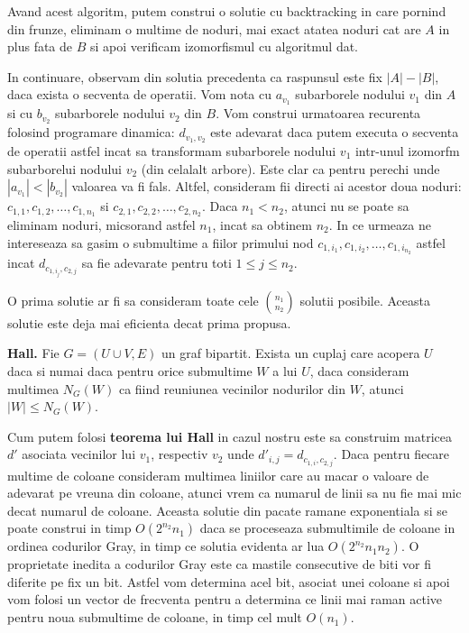 Avand acest algoritm, putem construi o solutie cu backtracking in care pornind din frunze, eliminam o multime de noduri, mai exact atatea
noduri cat are $A$ in plus fata de $B$ si apoi verificam izomorfismul cu algoritmul dat.

In continuare, observam din solutia precedenta ca raspunsul este fix $|A| - |B|$, daca exista o secventa de operatii. Vom nota cu $a_{v_{1}}$
subarborele nodului $v_{1}$ din $A$ si cu $b_{v_{2}}$ subarborele nodului $v_{2}$ din $B$. Vom construi urmatoarea recurenta folosind
programare dinamica: $d_{v_{1}, v_{2}}$ este adevarat daca putem executa o secventa de operatii astfel incat sa transformam subarborele
nodului $v_{1}$ intr-unul izomorfm subarborelui nodului $v_{2}$ (din celalalt arbore). Este clar ca pentru perechi unde $|a_{v_{1}}| < |b_{v_{2}}|$ valoarea va fi fals. Altfel, consideram fii directi ai acestor doua noduri: $c_{1, 1}, c_{1, 2}, \ldots, c_{1, n_{1}}$ si $c_{2, 1}, c_{2, 2}, \ldots, c_{2, n_{2}}$.
Daca $n_{1} < n_{2}$, atunci nu se poate sa eliminam noduri, micsorand astfel $n_{1}$, incat sa obtinem $n_{2}$. In ce urmeaza ne intereseaza sa gasim o
submultime a fiilor primului nod $c_{1, i_{1}}, c_{1, i_{2}}, \ldots, c_{1, i_{n_{2}}}$ astfel incat $d_{c_{1, i_{j}}, c_{2, j}}$ sa fie adevarate
pentru toti $1 \leq j \leq n_{2}$.

O prima solutie ar fi sa consideram toate cele $\binom{n_{1}}{n_{2}}$ solutii posibile. Aceasta solutie este deja mai eficienta decat prima propusa.

\begin{thm}
  \label{hall}
  \textbf{Hall.} Fie $G = (U \cup V, E)$ un graf bipartit. Exista un cuplaj care acopera $U$ daca si numai daca pentru orice submultime $W$
  a lui $U$, daca consideram multimea $N_{G}(W)$ ca fiind reuniunea vecinilor nodurilor din $W$, atunci $|W| \leq N_{G}(W)$.
\end{thm}

Cum putem folosi \textbf{teorema lui Hall} in cazul nostru este sa construim matricea $d'$ asociata vecinilor lui $v_{1}$, respectiv $v_{2}$
unde $d'_{i, j} = d_{c_{1, i}, c_{2, j}}$. Daca pentru fiecare multime de coloane consideram multimea liniilor care au macar o valoare de adevarat
pe vreuna din coloane, atunci vrem ca numarul de linii sa nu fie mai mic decat numarul de coloane. Aceasta solutie din pacate ramane exponentiala
si se poate construi in timp $O(2^{n_{2}} n_{1})$ daca se proceseaza submultimile de coloane in ordinea codurilor Gray, in timp ce solutia evidenta ar lua
$O(2^{n_{2}} n_{1}n_{2})$. O proprietate inedita a codurilor Gray este ca mastile consecutive de biti vor fi diferite pe fix un bit. Astfel vom determina acel bit,
asociat unei coloane si apoi vom folosi un vector de frecventa pentru a determina ce linii mai raman active pentru noua submultime de coloane, in timp
cel mult $O(n_{1})$.

